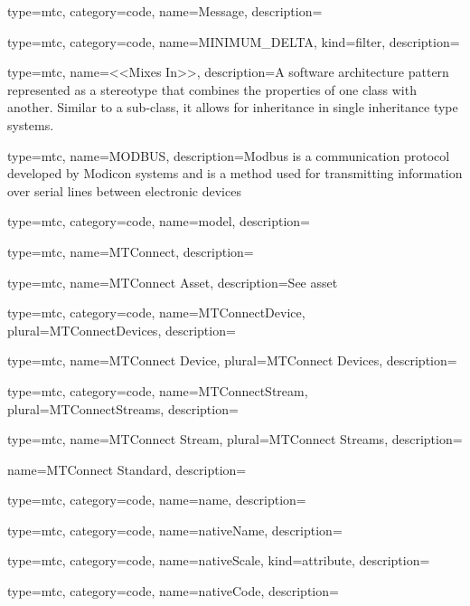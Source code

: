 {
  type=mtc,
  category=code,
  name={Message},
  description={}
}


{
  type=mtc,
  category=code,
  name={MINIMUM\_DELTA},
  kind={filter},
  description={}
}


{
  type=mtc,
  name={<<Mixes In>>},
  description={A software architecture pattern represented as a \gls{stereotype} that combines the properties of one class with another. Similar to a sub-class, it allows for inheritance in single inheritance type systems.}
}


{
  type=mtc,
  name=MODBUS,
  description={Modbus is a communication protocol developed by Modicon systems and is a method used for transmitting information over serial lines between electronic devices}
}


{
  type=mtc,
  category=code,
  name={model},
  description={}
}


{
  type=mtc,
  name={MTConnect},
  description={}
}


{
  type=mtc,
  name={MTConnect Asset},
  description={See \gls{asset}}
}


{
  type=mtc,
  category=code,
  name={MTConnectDevice},
  plural={MTConnectDevices},
  description={}
}


{
  type=mtc,
  name={MTConnect Device},
  plural={MTConnect Devices},
  description={}
}


{
  type=mtc,
  category=code,
  name={MTConnectStream},
  plural={MTConnectStreams},
  description={}
}


{
  type=mtc,
  name={MTConnect Stream},
  plural={MTConnect Streams},
  description={}
}


{
  name={MTConnect Standard},
  description={}
}


{
  type=mtc,
  category=code,
  name={name},
  description={}
}


{
  type=mtc,
  category=code,
  name={nativeName},
  description={}
}


{
  type=mtc,
  category=code,
  name={nativeScale},
  kind={attribute},
  description={}
}


{
  type=mtc,
  category=code,
  name={nativeCode},
  description={}
}


